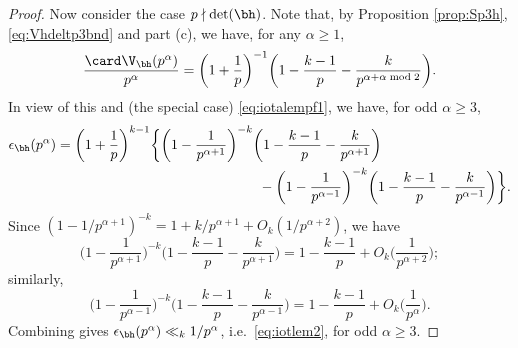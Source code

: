\documentclass[12pt, reqno, twoside, letterpaper]{amsart}
\begin{document}
\begin{proof}
Now consider the case $p \nmid \det(\bh)$.
%
Note that, by Proposition \ref{prop:Sp3h}, \eqref{eq:Vhdeltp3bnd} 
and part (c), we have, for any $\alpha \ge 1$,   
\[
 \frac{\card \V_{\bh}(p^{\alpha})}{p^{\alpha}}
  =
   \bigg(1 + \frac{1}{p}\bigg)^{-1}
    \bigg(1 - \frac{k - 1}{p} - \frac{k}{p^{\alpha + \alpha \bmod 2}}\bigg). 
\]
%
In view of this and (the special case) \eqref{eq:iotalempf1}, we 
have, for odd $\alpha \ge 3$,
\begin{align*}
 &  
 \epsilon_{\bh}(p^{\alpha})
  =
   \bigg(1 + \frac{1}{p}\bigg)^{k - 1}
    \bigg\{
     \bigg(1 - \frac{1}{p^{\alpha + 1}}\bigg)^{-k}
      \bigg(1 - \frac{k - 1}{p} - \frac{k}{p^{\alpha + 1}}\bigg)
 \\
 & \hspace{180pt}
       -
        \bigg(1 - \frac{1}{p^{\alpha - 1}}\bigg)^{-k}
         \bigg(1 - \frac{k - 1}{p} - \frac{k}{p^{\alpha - 1}}\bigg)
     \bigg\}.
\end{align*}
%
Since 
$
 (1 - 1/p^{\alpha + 1})^{-k} 
  = 
   1 + k/p^{\alpha + 1} + O_k(1/p^{\alpha + 2})
$,
we have 
\[
 \bigg(1 - \frac{1}{p^{\alpha + 1}}\bigg)^{-k}
  \bigg(1 - \frac{k - 1}{p} - \frac{k}{p^{\alpha + 1}}\bigg)
   =
    1 - \frac{k - 1}{p} + O_k\bigg(\frac{1}{p^{\alpha + 2}}\bigg);
\]
similarly, 
\[
 \bigg(1 - \frac{1}{p^{\alpha - 1}}\bigg)^{-k}
  \bigg(1 - \frac{k - 1}{p} - \frac{k}{p^{\alpha - 1}}\bigg)
   =
    1 - \frac{k - 1}{p} + O_k\bigg(\frac{1}{p^{\alpha}}\bigg).
\]
%
Combining gives $\epsilon_{\bh}(p^{\alpha}) \ll_k 1/p^{\alpha}$, 
i.e.\ \eqref{eq:iotlem2}, for odd $\alpha \ge 3$.


\end{proof}
\end{document}
